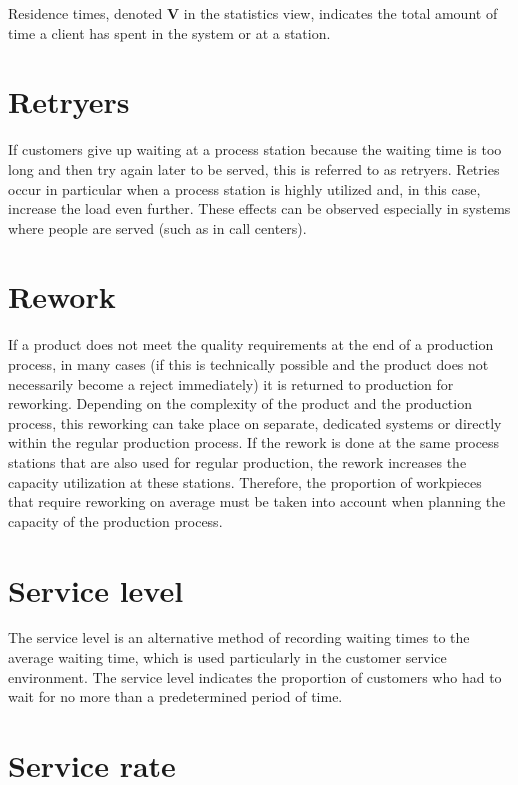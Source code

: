 Residence times, denoted \textbf{V} in the statistics view,
indicates the total amount of time a client has spent in the system or at a station.

\section*{Retryers}


If customers give up waiting at a process station because the waiting time is too long
and then try again later to be served, this is referred to as retryers.
Retries occur in particular when a process station is highly utilized and, in this case,
increase the load even further. These effects can be observed especially in systems
where people are served (such as in call centers).

\section*{Rework}


If a product does not meet the quality requirements at the end of a production process, in many cases
(if this is technically possible and the product does not necessarily become a reject immediately)
it is returned to production for reworking. Depending on the complexity of the product and the production
process, this reworking can take place on separate, dedicated systems or directly within the regular
production process. If the rework is done at the same process stations that are also used for regular
production, the rework increases the capacity utilization at these stations. Therefore, the proportion
of workpieces that require reworking on average must be taken into account when planning the capacity
of the production process.

\section*{Service level}


The service level is an alternative method of recording waiting times to the average waiting time,
which is used particularly in the customer service environment. The service level indicates
the proportion of customers who had to wait for no more than a predetermined period of time.

\section*{Service rate}


